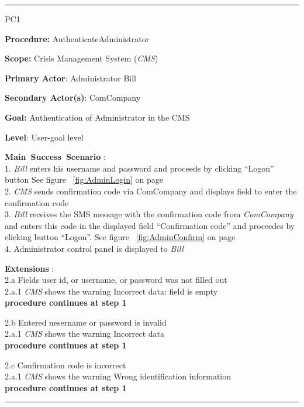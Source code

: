 \vspace{0.5cm}
\hrule
\begin{lyxlist}{PC1}
\small{
\item [\textbf{Procedure:}] AuthenticateAdministrator
\item [\textbf{Scope:}] Crisis Management System (\emph{CMS})
\item [\textbf{Primary Actor}:] Administrator Bill
\item [\textbf{Secondary Actor(s)}:] ComCompany
\item [\textbf{Goal:}] Authentication of Administrator in the CMS
\item [\textbf{Level}:] User-goal level
\item [\textbf{Main~Success~Scenario}]:\\
1. \emph{Bill} enters his username and password and proceeds by clicking
``Logon'' button
See figure ~\ref{fig:AdminLogin} on page~\pageref{fig:AdminLogin}\\
2. \emph{CMS} sends confirmation code via ComCompany and displays field to enter
the confirmation code \\
3. \emph{Bill} receives the SMS message with the confirmation code from
\emph{ComCompany} and enters this code in the displayed field ``Confirmation
code'' and proceedes by clicking button ``Logon''. See figure ~\ref{fig:AdminConfirm}
on page ~\pageref{fig:AdminConfirm}\\
4. Administrator control panel is displayed to \emph{Bill} 

\item [\textbf{Extensions}]:\\
2.a Fields user id, or username, or password was not filled out\\
\hspace*{0.5cm} 2.a.1 \emph{CMS} shows the warning Incorrect data: field is
empty\\
\hspace*{0.5cm} \textbf{procedure continues at step 1}

2.b Entered uesername or password is invalid\\
\hspace*{0.5cm} 2.a.1 \emph{CMS} shows the warning Incorrect data\\
\hspace*{0.5cm} \textbf{procedure continues at step 1}

2.c Confirmation code is incorrect\\
\hspace*{0.5cm} 2.a.1 \emph{CMS} shows the warning Wrong identification information\\
\hspace*{0.5cm} \textbf{procedure continues at step 1}

}
\end{lyxlist}
\hrule
\vspace{0.5cm}


